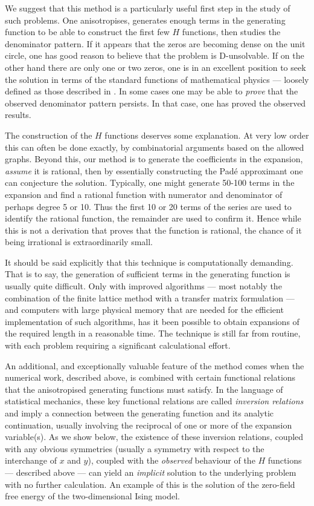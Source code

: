 We suggest that this method is a particularly useful first step in the
study of such problems. One anisotropises, generates enough
terms in the generating function to be able to construct
the first few $H$ functions, then studies the denominator pattern.
If it appears that the zeros are becoming dense on the unit
circle, one has good reason to believe
that the problem is D-unsolvable. If on
the other hand there are only one or two zeros, one is in an
excellent position to seek the solution in terms of the
standard functions of mathematical physics --- loosely defined
as those described in \cite{AS}. In some cases one may be able
to {\em prove} that the observed denominator pattern persists.
In that case, one has proved the observed results.

The construction of the $H$ functions deserves some explanation. 
At very low order this can often be done exactly, by combinatorial
arguments based on the allowed  graphs. Beyond this, our
method is to generate the coefficients in the expansion, {\em assume}
it is rational, then by essentially constructing the Pad\'e approximant
one can conjecture the solution. Typically, one might generate 50-100
terms in the expansion and find a rational function with numerator
and denominator of perhaps degree 5 or 10. Thus the first 10 or 20 terms of
the series are used to identify the rational function, the remainder
are used to confirm it. Hence while this is not a derivation that proves
that the function is rational,
the chance of it being irrational is extraordinarily small.

It should be said explicitly that this technique is computationally
demanding. That is to say, the generation of sufficient terms
in the generating function is usually quite difficult. Only
with improved algorithms --- most notably the combination of
the finite lattice method \cite{Neef77,Ent97} with a transfer matrix
formulation --- and computers with large physical memory that 
are needed for the efficient implementation of such algorithms,
has it been possible to obtain expansions of the required length
in a reasonable time. The technique is still far from routine,
with each problem requiring a significant calculational effort.

An additional, and exceptionally valuable feature of the
method comes when the numerical work, described above, is
combined
with certain functional relations that the anisotropised
generating functions must satisfy. In the language of
statistical mechanics, these key functional relations are
called {\em inversion relations} and imply a connection
between the generating function and its analytic continuation,
usually involving the reciprocal of one or more of the expansion
variable(s). As we show below, the existence of these inversion
relations, coupled with any obvious symmetries (usually
a symmetry with respect to the interchange of $x$ and $y$),
coupled with the {\em observed} behaviour of the $H$ functions ---
described above --- can yield an {\em implicit} solution to
the underlying problem with no further calculation. An
example of this is the solution \cite{Bax80} of the zero-field
free energy of the two-dimensional Ising model.

